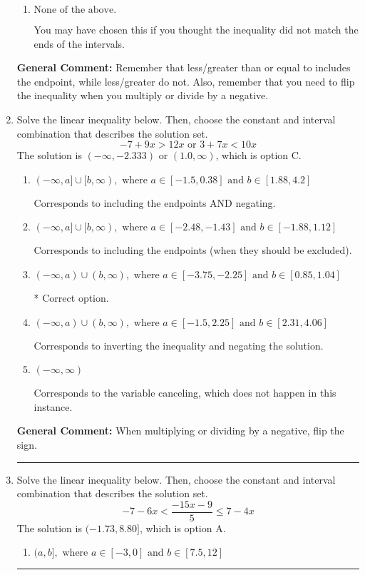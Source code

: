 \documentclass{extbook}[14pt]
\newcommand{\litem}[1]{\item #1

\rule{\textwidth}{0.4pt}}
\begin{document}
\begin{enumerate}
{\begin{enumerate}[label=\Alph*.]
 $(-0.167, \infty)$, which corresponds to negating the endpoint of the solution.
\item \( \text{None of the above}. \)

You may have chosen this if you thought the inequality did not match the ends of the intervals.
\end{enumerate}

\textbf{General Comment:} Remember that less/greater than or equal to includes the endpoint, while less/greater do not. Also, remember that you need to flip the inequality when you multiply or divide by a negative.
}
\litem{
Solve the linear inequality below. Then, choose the constant and interval combination that describes the solution set.
\[ -7 + 9 x > 12 x \text{ or } 3 + 7 x < 10 x \]The solution is \( (-\infty, -2.333) \text{ or } (1.0, \infty) \), which is option C.\begin{enumerate}[label=\Alph*.]
\item \( (-\infty, a] \cup [b, \infty), \text{ where } a \in [-1.5, 0.38] \text{ and } b \in [1.88, 4.2] \)

Corresponds to including the endpoints AND negating.
\item \( (-\infty, a] \cup [b, \infty), \text{ where } a \in [-2.48, -1.43] \text{ and } b \in [-1.88, 1.12] \)

Corresponds to including the endpoints (when they should be excluded).
\item \( (-\infty, a) \cup (b, \infty), \text{ where } a \in [-3.75, -2.25] \text{ and } b \in [0.85, 1.04] \)

 * Correct option.
\item \( (-\infty, a) \cup (b, \infty), \text{ where } a \in [-1.5, 2.25] \text{ and } b \in [2.31, 4.06] \)

Corresponds to inverting the inequality and negating the solution.
\item \( (-\infty, \infty) \)

Corresponds to the variable canceling, which does not happen in this instance.
\end{enumerate}

\textbf{General Comment:} When multiplying or dividing by a negative, flip the sign.
}
\litem{
Solve the linear inequality below. Then, choose the constant and interval combination that describes the solution set.
\[ -7 - 6 x < \frac{-15 x - 9}{5} \leq 7 - 4 x \]The solution is \( (-1.73, 8.80] \), which is option A.\begin{enumerate}[label=\Alph*.]
\item \( (a, b], \text{ where } a \in [-3, 0] \text{ and } b \in [7.5, 12] \)


\end{enumerate}}
\end{enumerate}
\end{document}
